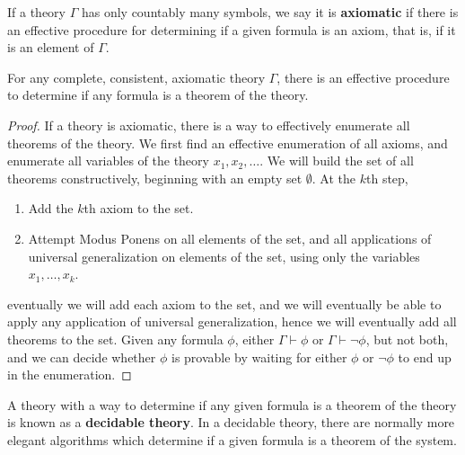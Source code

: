 If a theory $\Gamma$ has only countably many symbols, we say it is {\bf axiomatic} if there is an effective procedure for determining if a given formula is an axiom, that is, if it is an element of $\Gamma$.

\begin{theorem}
    For any complete, consistent, axiomatic theory $\Gamma$, there is an effective procedure to determine if any formula is a theorem of the theory.
\end{theorem}
\begin{proof}
    If a theory is axiomatic, there is a way to effectively enumerate all theorems of the theory. We first find an effective enumeration of all axioms, and enumerate all variables of the theory $x_1, x_2, \dots$. We will build the set of all theorems constructively, beginning with an empty set $\emptyset$. At the $k$th step,
    \begin{enumerate}
        \item Add the $k$th axiom to the set.
        \item Attempt Modus Ponens on all elements of the set, and all applications of universal generalization on elements of the set, using only the variables $x_1, \dots, x_k$.
    \end{enumerate}
    eventually we will add each axiom to the set, and we will eventually be able to apply any application of universal generalization, hence we will eventually add all theorems to the set. Given any formula $\phi$, either $\Gamma \vdash \phi$ or $\Gamma \vdash \neg \phi$, but not both, and we can decide whether $\phi$ is provable by waiting for either $\phi$ or $\neg \phi$ to end up in the enumeration.
\end{proof}

A theory with a way to determine if any given formula is a theorem of the theory is known as a {\bf decidable theory}. In a decidable theory, there are normally more elegant algorithms which determine if a given formula is a theorem of the system.


